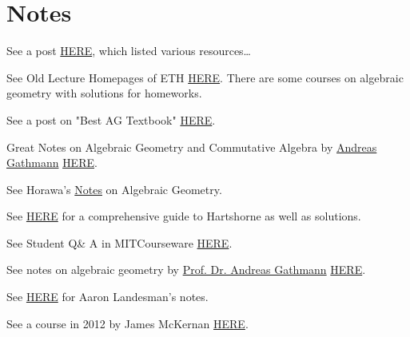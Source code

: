 \section{Notes}

See a post \href{https://math.stackexchange.com/questions/1678780/hartshorne-or-vakils-notes}{HERE}, which listed various resources\dots

See Old Lecture Homepages of ETH \href{https://www2.math.ethz.ch/education/bachelor/lectures.html}{HERE}. There are some courses on algebraic geometry with solutions for homeworks.

See a post on "Best AG Textbook" \href{https://math.stackexchange.com/questions/998/best-algebraic-geometry-text-book-other-than-hartshorne#:~:text=Before%20Hartshorne%27s%20book%20there%20was,and%20the%20sheaf%20of%20differentials.}{HERE}.

Great Notes on Algebraic Geometry and Commutative Algebra by \href{https://math.rptu.de/ags/agag/personen/leitung/gathmann/}{Andreas Gathmann} \href{https://agag-gathmann.math.rptu.de/de/notes.php}{HERE}.

See Horawa's \href{https://people.maths.ox.ac.uk/horawa/notes.html}{Notes} on Algebraic Geometry.

See \href{https://mathbooknotes.fandom.com/wiki/Hartshorne_-_Algebraic_Geometry}{HERE} for a comprehensive guide to Hartshorne as well as solutions.

See Student Q\& A in MITCourseware \href{https://ocw.mit.edu/courses/18-726-algebraic-geometry-spring-2009/pages/student-q-a/}{HERE}.

See notes on algebraic geometry by \href{https://math.rptu.de/en/wgs/agag/people/head/gathmann/}{Prof. Dr. Andreas Gathmann} \href{https://agag-gathmann.math.rptu.de/en/alggeom.php}{HERE}.


See \href{https://people.math.harvard.edu/~landesman/notes.html}{HERE} for Aaron Landesman's notes.

See a course in 2012 by James McKernan \href{https://math.mit.edu/~mckernan/Teaching/11-12/Spring/18.726/18.726.html}{HERE}.